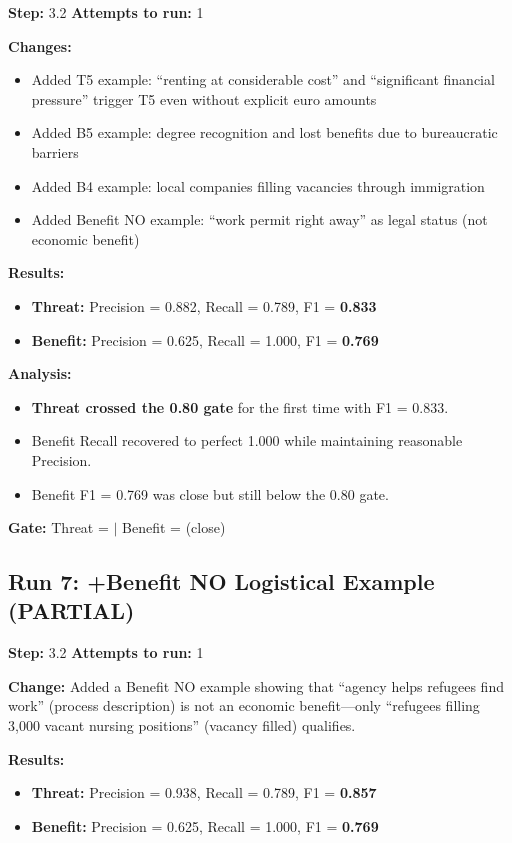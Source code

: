 \textbf{Step:} 3.2 \quad \textbf{Attempts to run:} 1

\textbf{Changes:}
\begin{itemize}
    \item Added T5 example: ``renting at considerable cost'' and ``significant financial pressure'' trigger T5 even without explicit euro amounts
    \item Added B5 example: degree recognition and lost benefits due to bureaucratic barriers
    \item Added B4 example: local companies filling vacancies through immigration
    \item Added Benefit NO example: ``work permit right away'' as legal status (not economic benefit)
\end{itemize}

\textbf{Results:}
\begin{itemize}
    \item \textbf{Threat:} Precision = 0.882, Recall = 0.789, F1 = \textbf{0.833}
    \item \textbf{Benefit:} Precision = 0.625, Recall = 1.000, F1 = \textbf{0.769}
\end{itemize}

\textbf{Analysis:}
\begin{itemize}
    \item \textbf{Threat crossed the 0.80 gate} for the first time with F1 = 0.833.
    \item Benefit Recall recovered to perfect 1.000 while maintaining reasonable Precision.
    \item Benefit F1 = 0.769 was close but still below the 0.80 gate.
\end{itemize}

\textbf{Gate:} Threat = \passmark $|$ Benefit = \failmark (close)

\subsection{Run 7: +Benefit NO Logistical Example (PARTIAL)}
\label{sec:run7}

\textbf{Step:} 3.2 \quad \textbf{Attempts to run:} 1

\textbf{Change:} Added a Benefit NO example showing that ``agency helps refugees find work'' (process description) is not an economic benefit---only ``refugees filling 3,000 vacant nursing positions'' (vacancy filled) qualifies.

\textbf{Results:}
\begin{itemize}
    \item \textbf{Threat:} Precision = 0.938, Recall = 0.789, F1 = \textbf{0.857}
    \item \textbf{Benefit:} Precision = 0.625, Recall = 1.000, F1 = \textbf{0.769}
\end{itemize}


